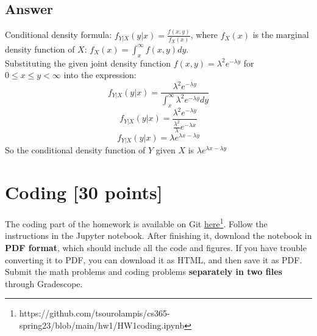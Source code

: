  \subsection{Answer}
 Conditional density formula: $f_{Y|X}(y|x) = \frac{f(x,y)}{f_X(x)}$, 
 where $f_X(x)$ is the marginal density function of $X$: $f_X(x) = \int_{x}^{\infty} f(x,y)dy$.\\
 Substituting the given joint density function $f(x,y)=\lambda^2 e^{-\lambda y}$ for $0\leq x \leq y<\infty$ into the expression:
 $$f_{Y|X}(y|x) = \frac{\lambda^2 e^{-\lambda y}}{\int_{x}^{\infty} \lambda^2 e^{-\lambda y}dy}$$
 $$f_{Y|X}(y|x) = \frac{\lambda^2 e^{-\lambda y}}{\frac{\lambda^2}{\lambda} e^{-\lambda x}}$$
 $$f_{Y|X}(y|x) = \lambda e^{\lambda x -\lambda y} $$
 So the conditional density function of $Y$ given $X$ is $\lambda e^{\lambda x -\lambda y} $









  \section{Coding [30 points]}

  The coding part of the homework is available on Git \href{https://github.com/tsourolampis/cs365-spring23/tree/main/hw1}{here}\footnote{https://github.com/tsourolampis/cs365-spring23/blob/main/hw1/HW1coding.ipynb}. Follow the instructions in the Jupyter notebook. After finishing it, download the notebook in \textbf{PDF format}, which should include all the code and figures. If you have trouble converting it to PDF, you can download it as HTML, and then save it as PDF. Submit the math problems and coding problems \textbf{separately in two files} through Gradescope.

